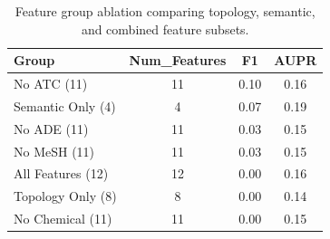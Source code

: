 \begin{table}[htbp]
\centering
\caption{Feature group ablation comparing topology, semantic, and combined feature subsets.}
\label{tab:ablation_groups}
\begin{tabular}{lccc}
\toprule
Group & Num_Features & F1 & AUPR \\
\midrule
No ATC (11) & 11 & 0.10 & 0.16 \\
Semantic Only (4) & 4 & 0.07 & 0.19 \\
No ADE (11) & 11 & 0.03 & 0.15 \\
No MeSH (11) & 11 & 0.03 & 0.15 \\
All Features (12) & 12 & 0.00 & 0.16 \\
Topology Only (8) & 8 & 0.00 & 0.14 \\
No Chemical (11) & 11 & 0.00 & 0.15 \\
\bottomrule
\end{tabular}
\end{table}